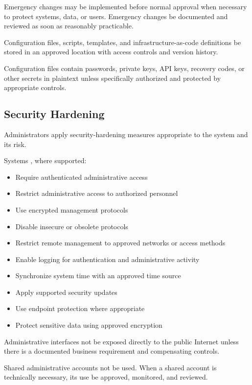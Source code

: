 Emergency changes may be implemented before normal approval when necessary to protect systems, data, or users. Emergency changes \must{} be documented and reviewed as soon as reasonably practicable.

Configuration files, scripts, templates, and infrastructure-as-code definitions \should{} be stored in an approved location with access controls and version history.

Configuration files \mustnot{} contain passwords, private keys, API keys, recovery codes, or other secrets in plaintext unless specifically authorized and protected by appropriate controls.

\subsection{Security Hardening}

Administrators \must{} apply security-hardening measures appropriate to the system and its risk.

Systems \must{}, where supported:
\begin{itemize}
    \item Require authenticated administrative access
    \item Restrict administrative access to authorized personnel
    \item Use encrypted management protocols
    \item Disable insecure or obsolete protocols
    \item Restrict remote management to approved networks or access methods
    \item Enable logging for authentication and administrative activity
    \item Synchronize system time with an approved time source
    \item Apply supported security updates
    \item Use endpoint protection where appropriate
    \item Protect sensitive data using approved encryption
\end{itemize}

Administrative interfaces \should{} not be exposed directly to the public Internet unless there is a documented business requirement and compensating controls.

Shared administrative accounts \should{} not be used. When a shared account is technically necessary, its use \must{} be approved, monitored, and reviewed.


